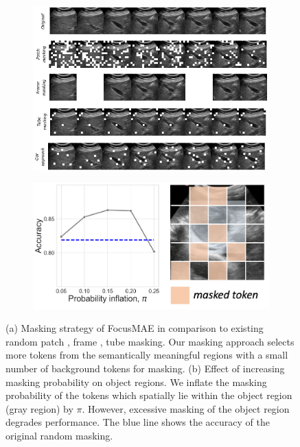 \begin{figure}[t]
    \centering
    \begin{subfigure}[b]{0.45\linewidth}
        \centering
        \includegraphics[width=\linewidth]{figs/focusmae/teaser_patch.jpg}
        \caption{}
        \label{focusmae_fig:teaser_a}
    \end{subfigure}
	\begin{subfigure}[b]{0.45\linewidth}
		\centering
		\includegraphics[width=0.95\linewidth]{figs/focusmae/obj_prior.png}
		\caption{}
		\label{focusmae_fig:teaser_b}
	\end{subfigure}
    \caption[Masking strategy of FocusMAE and its motivation]{(a) Masking strategy of FocusMAE in comparison to existing random patch \cite{maest}, frame \cite{wei2022masked}, tube \cite{videomae} masking. Our masking approach selects more tokens from the semantically meaningful regions with a small number of background tokens for masking. (b) Effect of increasing masking probability on object regions. We inflate the masking probability of the tokens which spatially lie within the object region (gray region) by $\pi$. However, excessive masking of the object region degrades performance. The blue line shows the accuracy of the original random masking. }
    \label{focusmae_fig:teaser}
\end{figure}


